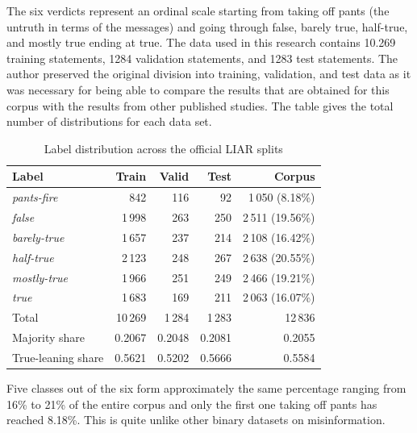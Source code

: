 \documentclass[10pt,twocolumn,twoside,a4paper]{article}
\begin{document}
The six verdicts represent an ordinal scale starting from taking off pants (the untruth in terms of the messages) and going through false, barely true, half-true, and mostly true ending at true. The data used in this research contains 10.269 training statements, 1284 validation statements, and 1283 test statements. The author preserved the original division into training, validation, and test data as it was necessary for being able to compare the results that are obtained for this corpus with the results from other published studies. The table gives the total number of distributions for each data set.

\begin{table}[t]
\caption{Label distribution across the official LIAR splits}
\label{tab:splits}
\centering
\footnotesize
\begin{tabular}{@{}lrrrr@{}}
\toprule
Label & Train & Valid & Test & Corpus \\
\midrule
\emph{pants-fire}  &   842 & 116 &  92 & 1\,050 \;(8.18\%) \\
\emph{false}       & 1\,998 & 263 & 250 & 2\,511 \;(19.56\%) \\
\emph{barely-true} & 1\,657 & 237 & 214 & 2\,108 \;(16.42\%) \\
\emph{half-true}   & 2\,123 & 248 & 267 & 2\,638 \;(20.55\%) \\
\emph{mostly-true} & 1\,966 & 251 & 249 & 2\,466 \;(19.21\%) \\
\emph{true}        & 1\,683 & 169 & 211 & 2\,063 \;(16.07\%) \\
\midrule
Total              & 10\,269 & 1\,284 & 1\,283 & 12\,836 \\
Majority share     & 0.2067 & 0.2048 & 0.2081 & 0.2055 \\
True-leaning share & 0.5621 & 0.5202 & 0.5666 & 0.5584 \\
\bottomrule
\end{tabular}
\end{table}

Five classes out of the six form approximately the same percentage ranging from 16\% to 21\% of the entire corpus and only the first one taking off pants has reached 8.18\%. This is quite unlike other binary datasets on misinformation.
\end{document}
